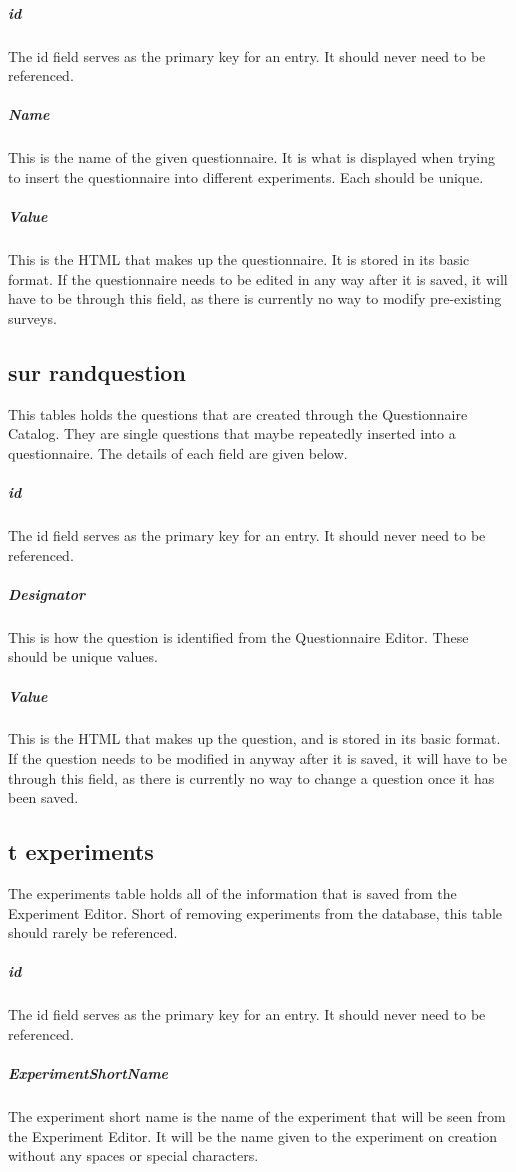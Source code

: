 \documentclass[article]{ij4uq}              %
\begin{document}
\subparagraph{id}
The id field serves as the primary key for an entry. It should never need to be referenced. 

\subparagraph{Name}
This is the name of the given questionnaire. It is what is displayed when trying to insert the questionnaire into different experiments. Each should be unique. 

\subparagraph{Value}
This is the HTML that makes up the questionnaire. It is stored in its basic format. If the questionnaire needs to be edited in any way after it is saved, it will have to be through this field, as there is currently no way to modify pre-existing surveys. 

\subsection{sur randquestion}
This tables holds the questions that are created through the Questionnaire Catalog. They are single questions that maybe repeatedly inserted into a questionnaire. The details of each field are given below. 

\subparagraph{id}
The id field serves as the primary key for an entry. It should never need to be referenced. 

\subparagraph{Designator}
This is how the question is identified from the Questionnaire Editor. These should be unique values. 

\subparagraph{Value}
This is the HTML that makes up the question, and is stored in its basic format. If the question needs to be modified in anyway after it is saved, it will have to be through this field, as there is currently no way to change a question once it has been saved. 


\subsection{t experiments }
The experiments table holds all of the information that is saved from the Experiment Editor. Short of removing experiments from the database, this table should rarely be referenced. 

\subparagraph{id} 
The id field serves as the primary key for an entry. It should never need to be referenced. 

\subparagraph{ExperimentShortName}
The experiment short name is the name of the experiment that will be seen from the Experiment Editor. It will be the name given to the experiment on creation without any spaces or special characters. 
\end{document}
